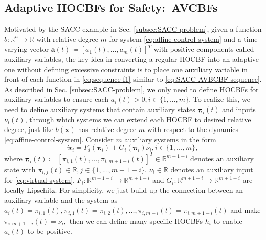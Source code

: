 \subsection{Adaptive HOCBFs for Safety:\ AVCBFs}
\label{sec:AVCBFs}

Motivated by the SACC example in Sec. \ref{subsec:SACC-problem}, given a function $b:\mathbb{R}^{n}\to\mathbb{R}$ with relative degree $m$ for system \eqref{eq:affine-control-system} and a time-varying vector $\boldsymbol{a}(t)\coloneqq [a_{1}(t),\dots,a_{m}(t)]^{T}$ with positive components called auxiliary variables, the key idea in converting a regular HOCBF into an adaptive
one without defining excessive constraints is to place one auxiliary variable in front of each function in \eqref{eq:sequence-f1} similar to \eqref{eq:SACC-AVBCBF-sequence}. 
As described in Sec. \ref{subsec:SACC-problem}, we only need to define HOCBFs for auxiliary variables to ensure each $a_{i}(t)>0, i \in \{1,...,m\}.$ To realize this, we need to define auxiliary systems that contain auxiliary states $\boldsymbol{\pi}_{i}(t)$ and inputs $\nu_{i}(t)$, through which systems we can extend each HOCBF to desired relative degree, just like $b(\boldsymbol{x})$ has relative degree $m$
with respect to the dynamics \eqref{eq:affine-control-system}. Consider $m$ auxiliary systems in the form 
\begin{equation}
\label{eq:virtual-system}
\dot{\boldsymbol{\pi}}_{i}=F_{i}(\boldsymbol{\pi}_{i})+G_{i}(\boldsymbol{\pi}_{i})\nu_{i}, i \in \{1,...,m\},
\end{equation}
where $\boldsymbol{\pi}_{i}(t)\coloneqq [\pi_{i,1}(t),\dots,\pi_{i,m+1-i}(t)]^{T}\in \mathbb{R}^{m+1-i}$ denotes an auxiliary state with $\pi_{i,j}(t)\in \mathbb{R}, j \in \{1,...,m+1-i\}.$ $\nu_{i}\in \mathbb{R}$ denotes an auxiliary input for \eqref{eq:virtual-system}, $F_{i}:\mathbb{R}^{m+1-i}\to\mathbb{R}^{m+1-i}$ and $G_{i}:\mathbb{R}^{m+1-i}\to\mathbb{R}^{m+1-i}$ are locally Lipschitz. For simplicity, we just build up the connection between an auxiliary variable and the system as $a_{i}(t)=\pi_{i,1}(t), \dot{\pi}_{i,1}(t)=\pi_{i,2}(t),\dots,\dot{\pi}_{i,m-i}(t)=\pi_{i,m+1-i}(t)$ and make $\dot{\pi}_{i,m+1-i}(t)=\nu_{i},$ then we can define many specific HOCBFs $h_{i}$ to enable $a_{i}(t)$ to be positive. 

